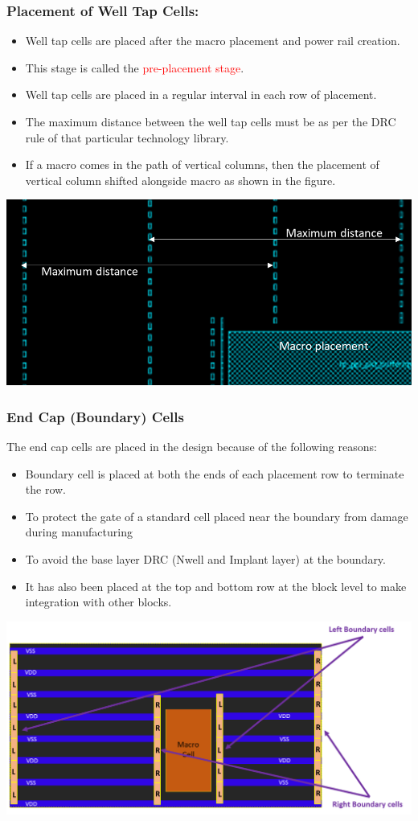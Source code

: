 \documentclass{beamer}
\begin{document}
\begin{frame}
	\frametitle{Placement of  Well Tap Cells:}
	\begin{itemize}
		\item Well tap cells are placed after the macro placement and power rail creation.
		\item This stage is called the \textcolor {red} {pre-placement stage}.
		\item Well tap cells are placed in a regular interval in each row of placement.
		\item The maximum distance between the well tap cells must be as per the DRC rule of that particular technology library.
		\item If a macro comes in the path of vertical columns, then the placement of vertical column shifted alongside macro as shown in the figure.
	\end{itemize}
	\begin{center}
		\includegraphics[width=0.4 \textwidth]{wellTapPlacement}
	\end{center}
\end{frame}
	\begin{frame}
	\frametitle{End Cap (Boundary) Cells}
	The end cap cells are placed in the design because of the following reasons:
	\begin{itemize}
		\item Boundary cell is placed at both the ends of each placement row to terminate the row.
		\item To protect the gate of a standard cell placed near the boundary from damage during manufacturing
		\item To avoid the base layer DRC (Nwell and Implant layer) at the boundary.
		\item It has also been placed at the top and bottom row at the block level to make integration with other blocks.
	\end{itemize}
	\begin{center}
		\includegraphics[width=0.45 \textwidth]{EndCapPlacement}
	\end{center}
\end{frame}	
\end{document}
